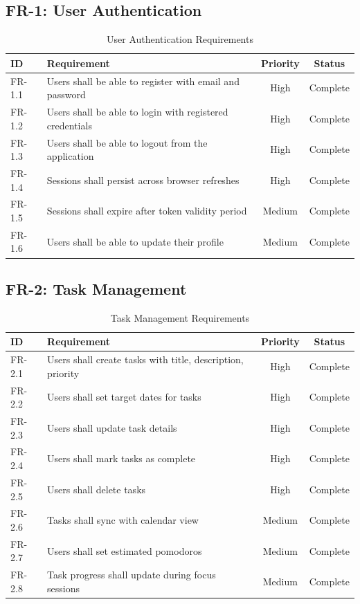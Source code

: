         \subsection{FR-1: User Authentication}
        \begin{table}[H]
        \centering
        \begin{tabular}{|l|p{7cm}|c|c|}
        \hline
        \textbf{ID} & \textbf{Requirement} & \textbf{Priority} & \textbf{Status} \\
        \hline
        FR-1.1 & Users shall be able to register with email and password & High & Complete \\
        FR-1.2 & Users shall be able to login with registered credentials & High & Complete \\
        FR-1.3 & Users shall be able to logout from the application & High & Complete \\
        FR-1.4 & Sessions shall persist across browser refreshes & High & Complete \\
        FR-1.5 & Sessions shall expire after token validity period & Medium & Complete \\
        FR-1.6 & Users shall be able to update their profile & Medium & Complete \\
        \hline
        \end{tabular}
        \caption{User Authentication Requirements}
        \end{table}

        \subsection{FR-2: Task Management}
        \begin{table}[H]
        \centering
        \begin{tabular}{|l|p{7cm}|c|c|}
        \hline
        \textbf{ID} & \textbf{Requirement} & \textbf{Priority} & \textbf{Status} \\
        \hline
        FR-2.1 & Users shall create tasks with title, description, priority & High & Complete \\
        FR-2.2 & Users shall set target dates for tasks & High & Complete \\
        FR-2.3 & Users shall update task details & High & Complete \\
        FR-2.4 & Users shall mark tasks as complete & High & Complete \\
        FR-2.5 & Users shall delete tasks & High & Complete \\
        FR-2.6 & Tasks shall sync with calendar view & Medium & Complete \\
        FR-2.7 & Users shall set estimated pomodoros & Medium & Complete \\
        FR-2.8 & Task progress shall update during focus sessions & Medium & Complete \\
        \hline
        \end{tabular}
        \caption{Task Management Requirements}
        \end{table}

